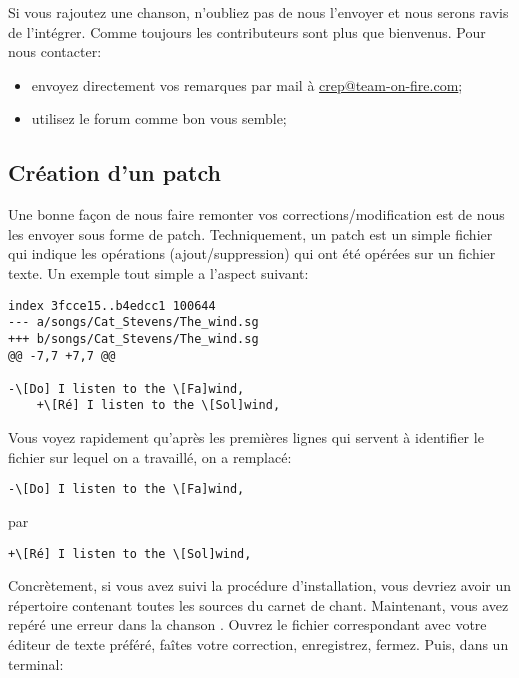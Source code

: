 \documentclass[versionenligne]{patacrep}
\begin{document}
Si vous rajoutez une chanson, n'oubliez pas de nous l'envoyer et nous
serons ravis de l'intégrer. Comme toujours les contributeurs sont plus
que bienvenus. Pour nous contacter:

\begin{itemize}
\item envoyez directement vos remarques par mail à
  \url{crep@team-on-fire.com};
\item utilisez le forum comme bon vous semble;
\end{itemize}


\subsection{Création d'un patch}

Une bonne façon de nous faire remonter vos corrections/modification
est de nous les envoyer sous forme de patch. Techniquement, un patch
est un simple fichier qui indique les opérations (ajout/suppression)
qui ont été opérées sur un fichier texte. Un exemple tout simple a
l'aspect suivant:

\begin{verbatim}
index 3fcce15..b4edcc1 100644
--- a/songs/Cat_Stevens/The_wind.sg
+++ b/songs/Cat_Stevens/The_wind.sg
@@ -7,7 +7,7 @@

-\[Do] I listen to the \[Fa]wind,
    +\[Ré] I listen to the \[Sol]wind,
\end{verbatim}

Vous voyez rapidement qu'après les premières lignes qui servent à
identifier le fichier sur lequel on a travaillé, on a remplacé:
\begin{verbatim}
-\[Do] I listen to the \[Fa]wind,
\end{verbatim}
par
\begin{verbatim}
+\[Ré] I listen to the \[Sol]wind,
\end{verbatim}

Concrètement, si vous avez suivi la procédure d'installation, vous
devriez avoir un répertoire  contenant toutes
les sources du carnet de chant. Maintenant, vous avez repéré une
erreur dans la chanson . Ouvrez le
fichier correspondant avec votre éditeur de texte préféré, faîtes
votre correction, enregistrez, fermez. Puis, dans un terminal:
\end{document}
